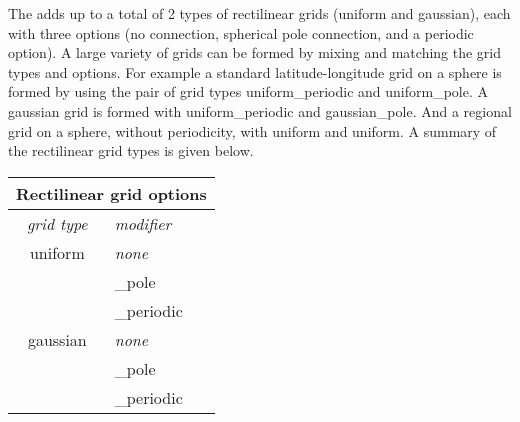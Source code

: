 The adds up to a total of 2 types of rectilinear grids (uniform and gaussian), each with three options (no connection, spherical pole connection, and a periodic option). A large variety of grids can be formed by mixing and matching the grid types and options. For example a standard latitude-longitude grid on a sphere is formed by using the pair of grid types uniform\_periodic and uniform\_pole. A gaussian grid is formed with uniform\_periodic and gaussian\_pole. And a regional grid on a sphere, without periodicity, with uniform and uniform. A summary of the rectilinear grid types is given below. 
\begin{center}
\begin{tabular}{| c | l |} 
\multicolumn{2}{c}{Rectilinear grid options}  \\ 
\hline
{\em grid type } & {\em modifier} \\
\hline \hline
 uniform &  {\em none } \\ 
              &  \_pole         \\
              &   \_periodic  \\
 \hline
 gaussian & {\em none } \\
                 & \_pole         \\
                &  \_periodic \\
  \hline
\end{tabular}
\end{center}

